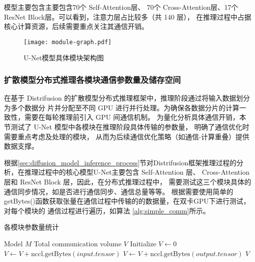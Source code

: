 模型主要包含主要包含70个 Self-Attention层、
70个 Cross-Attention层、17个 ResNet Block层。可以看到，注意力层占比较多（共 140 层），
在推理过程中占据核心计算资源，后续需要重点关注其通信开销。
\begin{figure}[ht]
    \centering
    \texttt{[image: module-graph.pdf]}
    \caption{U-Net模型具体模块架构图}\label{fig:module-graph}
\end{figure}
\subsubsection{扩散模型分布式推理各模块通信参数量及储存空间}
\label{sec:diffusion_model_distributed_inference_communication_parameter}
\par
在基于 Distrifusion 的扩散模型分布式推理框架中，推理阶段通过将输入数据划分为多个数据分
片并分配至不同 GPU 进行并行处理。为确保各数据分片的计算一致性，需要在每轮推理前引入 GPU 间通信机制。
为量化分析具体通信开销\cite{Li2024DistriFusionDP}，本节测试了 U-Net 模型中各模块在推理阶段具体传输的参数量，
明确了通信优化时需要重点考虑及处理的模块，
从而为后续通信优化策略（如通信-计算重叠）提供数据支撑。
\par
根据\ref{sec:diffusion_model_inference_process}节对Distrifusion框架推理过程的分析，在推理过程中的核心模型U-Net主要包含 Self-Attention 层、
Cross-Attention 层和 ResNet Block 层，因此，在分布式推理过程中，
需要测试这三个模块具体的通信同步情况，如是否进行通信同步、通信总量等等。
根据需要使用简单的getBytes()函数获取张量在通信过程中传输的的数据量，在双卡GPU下进行测试，对每个模块的
通信过程进行遍历，如算法 \ref{alg:simple_comm}所示。
\begin{algorithm}[!h]
    \caption{各模块参数量统计}
    \label{alg:simple_comm}
    \renewcommand{\algorithmicrequire}{\textbf{Input:}}
    \renewcommand{\algorithmicensure}{\textbf{Output:}}
    \begin{algorithmic}[1]
        \REQUIRE Model $M$
        \ENSURE Total communication volume $V$
        \STATE Initialize $V \leftarrow 0$
                    \STATE $V \leftarrow V + \text{nccl.getBytes}(input.tensor)$
                \ENDFOR
                    \STATE $V \leftarrow V + \text{nccl.getBytes}(output.tensor)$
                \ENDFOR
            \ENDIF
        \ENDFOR
        \RETURN $V$
    \end{algorithmic}
\end{algorithm}
